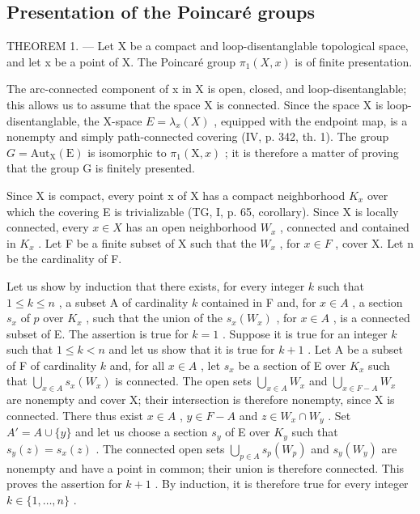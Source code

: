 \subsection{Presentation of the Poincaré groups}

THEOREM 1. --- Let X be a compact and loop-disentanglable topological space, and let x be a point of X. The Poincaré group \(\pi_{1}(X,x)\) is of finite presentation.

The arc-connected component of x in X is open, closed, and loop-disentanglable; this allows us to assume that the space X is connected. Since the space X is loop-disentanglable, the X-space \(E = \lambda_{x}(X)\) , equipped with the endpoint map, is a nonempty and simply path-connected covering (IV, p. 342, th. 1). The group \(G = \text{Aut}_{\text{X}}(\text{E})\) is isomorphic to \(\pi_{1}(\text{X}, x)\) ; it is therefore a matter of proving that the group G is finitely presented.

Since X is compact, every point x of X has a compact neighborhood \(K_{x}\) over which the covering E is trivializable (TG, I, p. 65, corollary). Since X is locally connected, every \(x \in X\) has an open neighborhood \(W_{x}\) , connected and contained in \(K_{x}\) . Let F be a finite subset of X such that the \(W_{x}\) , for \(x \in F\) , cover X. Let n be the cardinality of F.

Let us show by induction that there exists, for every integer \(k\) such that \(1 \leqslant k \leqslant n\) , a subset A of cardinality \(k\) contained in F and, for \(x \in A\) , a section \(s_x\) of \(p\) over \(K_x\) , such that the union of the \(s_x(W_x)\) , for \(x \in A\) , is a connected subset of E. The assertion is true for \(k = 1\) . Suppose it is true for an integer \(k\) such that \(1 \leqslant k < n\) and let us show that it is true for \(k + 1\) . Let A be a subset of F of cardinality \(k\) and, for all \(x \in A\) , let \(s_x\) be a section of E over \(K_x\) such that \(\bigcup_{x \in A} s_x(W_x)\) is connected. The open sets \(\bigcup_{x \in A} W_x\) and \(\bigcup_{x \in F-A} W_x\) are nonempty and cover X; their intersection is therefore nonempty, since X is connected. There thus exist \(x \in A\) , \(y \in F - A\) and \(z \in W_x \cap W_y\) . Set \(A' = A \cup \{y\}\) and let us choose a section \(s_y\) of E over \(K_y\) such that \(s_y(z) = s_x(z)\) . The connected open sets \(\bigcup_{p \in A} s_p(W_p)\) and \(s_y(W_y)\) are nonempty and have a point in common; their union is therefore connected. This proves the assertion for \(k + 1\) . By induction, it is therefore true for every integer \(k \in \{1, \ldots, n\}\) .

